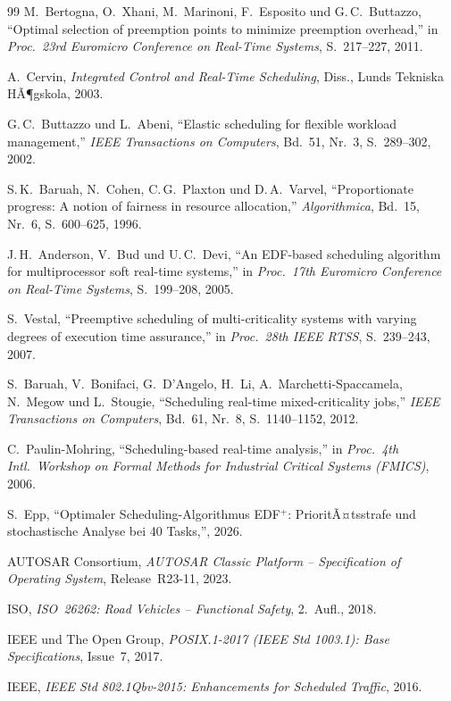 ﻿\documentclass[a4paper,12pt]{report}
\theoremstyle{definition}
\begin{document}
\begin{thebibliography}{99}
M.\ Bertogna, O.\ Xhani, M.\ Marinoni, F.\ Esposito und G.\,C.\ Buttazzo,
``Optimal selection of preemption points to minimize preemption overhead,''
in \textit{Proc.\ 23rd Euromicro Conference on Real-Time Systems},
S.~217--227, 2011.


A.\ Cervin,
\textit{Integrated Control and Real-Time Scheduling},
Diss., Lunds Tekniska HÃ¶gskola, 2003.

G.\,C.\ Buttazzo und L.\ Abeni,
``Elastic scheduling for flexible workload management,''
\textit{IEEE Transactions on Computers}, Bd.~51, Nr.~3, S.~289--302, 2002.


S.\,K.\ Baruah, N.\ Cohen, C.\,G.\ Plaxton und D.\,A.\ Varvel,
``Proportionate progress: A notion of fairness in resource allocation,''
\textit{Algorithmica}, Bd.~15, Nr.~6, S.~600--625, 1996.

J.\,H.\ Anderson, V.\ Bud und U.\,C.\ Devi,
``An EDF-based scheduling algorithm for multiprocessor soft real-time systems,''
in \textit{Proc.\ 17th Euromicro Conference on Real-Time Systems},
S.~199--208, 2005.


S.\ Vestal,
``Preemptive scheduling of multi-criticality systems with varying
degrees of execution time assurance,''
in \textit{Proc.\ 28th IEEE RTSS}, S.~239--243, 2007.

S.\ Baruah, V.\ Bonifaci, G.\ D'Angelo, H.\ Li, A.\ Marchetti-Spaccamela,
N.\ Megow und L.\ Stougie,
``Scheduling real-time mixed-criticality jobs,''
\textit{IEEE Transactions on Computers}, Bd.~61, Nr.~8, S.~1140--1152, 2012.


C.\ Paulin-Mohring,
``Scheduling-based real-time analysis,''
in \textit{Proc.\ 4th Intl.\ Workshop on Formal Methods for Industrial
Critical Systems (FMICS)}, 2006.


S.\ Epp,
``Optimaler Scheduling-Algorithmus EDF$^+$: PrioritÃ¤tsstrafe und
stochastische Analyse bei 40 Tasks,'', 2026.


AUTOSAR Consortium,
\textit{AUTOSAR Classic Platform -- Specification of Operating System},
Release~R23-11, 2023.

ISO,
\textit{ISO~26262: Road Vehicles -- Functional Safety},
2.~Aufl., 2018.

IEEE und The Open Group,
\textit{POSIX.1-2017 (IEEE Std 1003.1): Base Specifications},
Issue~7, 2017.

IEEE,
\textit{IEEE Std 802.1Qbv-2015: Enhancements for Scheduled Traffic},
2016.

\end{thebibliography}
\end{document}
